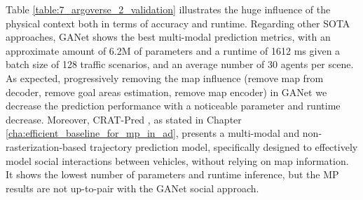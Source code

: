 Table \ref{table:7_argoverse_2_validation} illustrates the huge influence of the physical context both in terms of accuracy and runtime. Regarding other \ac{SOTA} approaches, GANet \cite{wang2022ganet} shows the best multi-modal prediction metrics, with an approximate amount of 6.2M of parameters and a runtime of 1612 ms given a batch size of 128 traffic scenarios, and an average number of 30 agents per scene. As expected, progressively removing the map influence (remove map from decoder, remove goal areas estimation, remove map encoder) in GANet we decrease the prediction performance with a noticeable parameter and runtime decrease. Moreover, CRAT-Pred \cite{schmidt2022crat}, as stated in Chapter \ref{cha:efficient_baseline_for_mp_in_ad}, presents a multi-modal and non-rasterization-based trajectory prediction model, specifically designed to effectively model social interactions between vehicles, without relying on map information. It shows the lowest number of parameters and runtime inference, but the MP results are not up-to-pair with the GANet social approach. 

